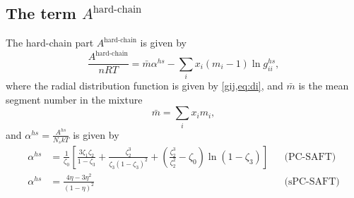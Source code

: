 \documentclass[english]{../thermomemo/thermomemo}
\newcommand{\z}{\zeta}
\newcommand{\lp}{\left(}
\newcommand{\rp}{\right)}
\begin{document}
\subsection{The term $A^{\text{hard-chain}}$}
The hard-chain part $A^{\text{hard-chain}}$ is given by
\begin{equation}
  \frac{A^{\text{hard-chain}}}{nRT} = \bar m \alpha^{hs} - \sum_i x_i(m_i-1)\ln g_{ii}^{hs},
\end{equation}
where the radial distribution function is given by \cref{gij,eq:di}, and $\bar m$ is the mean segment number in the mixture
\begin{equation}
  \bar m = \sum_i x_i m_i,
\end{equation}
and $\alpha^{hs} = \frac{A^{hs}}{N_s k T}$ is given by
\begin{align}
  \alpha^{hs} &= \frac{1}{\z_0} \left[ \frac{3\z_1\z_2}{1-\z_3} + \frac{\z_2^3}{\z_3(1-\z_3)^2} + \lp \frac{\z_2^3}{\z_2^2} - \z_0 \rp \ln(1-\z_3) \right]  && \text{(PC-SAFT)} \\
  \alpha^{hs} &= \frac{4\eta-3\eta^2}{(1-\eta)^2} && \text{(sPC-SAFT)} 
\end{align}
\end{document}
